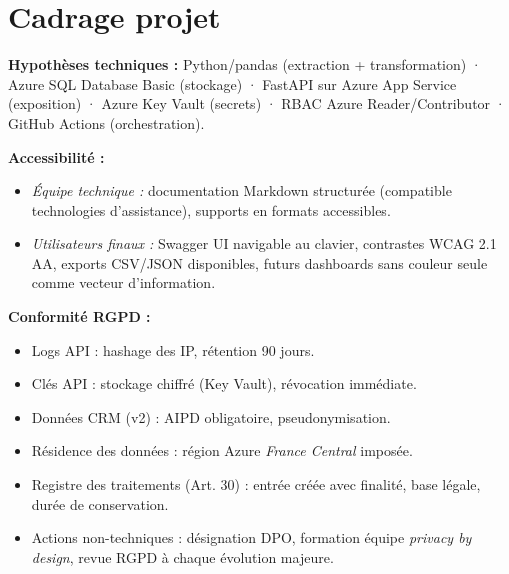 \documentclass[11pt,a4paper]{article}
\begin{document}
\vspace{0.5cm}

\section{Cadrage projet}

\textbf{Hypothèses techniques :} Python/pandas (extraction + transformation) · Azure SQL Database Basic (stockage) · FastAPI sur Azure App Service (exposition) · Azure Key Vault (secrets) · RBAC Azure Reader/Contributor · GitHub Actions (orchestration).

\textbf{Accessibilité :}
\begin{itemize}
  \item \textit{Équipe technique :} documentation Markdown structurée (compatible technologies d'assistance), supports en formats accessibles.
  \item \textit{Utilisateurs finaux :} Swagger UI navigable au clavier, contrastes WCAG 2.1 AA, exports CSV/JSON disponibles, futurs dashboards sans couleur seule comme vecteur d'information.
\end{itemize}

\textbf{Conformité RGPD :}
\begin{itemize}
  \item Logs API : hashage des IP, rétention 90 jours.
  \item Clés API : stockage chiffré (Key Vault), révocation immédiate.
  \item Données CRM (v2) : AIPD obligatoire, pseudonymisation.
  \item Résidence des données : région Azure \textit{France Central} imposée.
  \item Registre des traitements (Art. 30) : entrée créée avec finalité, base légale, durée de conservation.
  \item Actions non-techniques : désignation DPO, formation équipe \textit{privacy by design}, revue RGPD à chaque évolution majeure.
\end{itemize}
\end{document}
